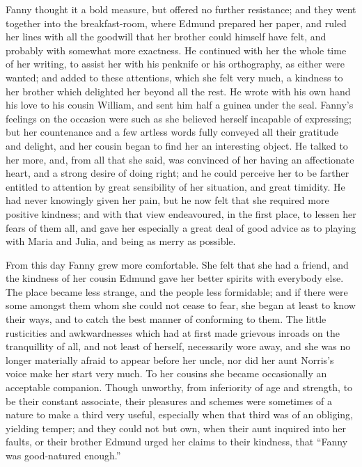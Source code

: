 \documentclass{article}
\begin{document}
Fanny thought it a bold measure, but offered no further
resistance; and they went together into the breakfast-room,
where Edmund prepared her paper, and ruled her lines
with all the goodwill that her brother could himself
have felt, and probably with somewhat more exactness.
He continued with her the whole time of her writing,
to assist her with his penknife or his orthography,
as either were wanted; and added to these attentions,
which she felt very much, a kindness to her brother which
delighted her beyond all the rest.  He wrote with his own
hand his love to his cousin William, and sent him half
a guinea under the seal.  Fanny's feelings on the occasion
were such as she believed herself incapable of expressing;
but her countenance and a few artless words fully
conveyed all their gratitude and delight, and her cousin
began to find her an interesting object.  He talked
to her more, and, from all that she said, was convinced
of her having an affectionate heart, and a strong desire
of doing right; and he could perceive her to be farther
entitled to attention by great sensibility of her situation,
and great timidity.  He had never knowingly given her pain,
but he now felt that she required more positive kindness;
and with that view endeavoured, in the first place,
to lessen her fears of them all, and gave her especially
a great deal of good advice as to playing with Maria
and Julia, and being as merry as possible.

From this day Fanny grew more comfortable.  She felt
that she had a friend, and the kindness of her cousin
Edmund gave her better spirits with everybody else.
The place became less strange, and the people less formidable;
and if there were some amongst them whom she could not
cease to fear, she began at least to know their ways,
and to catch the best manner of conforming to them.
The little rusticities and awkwardnesses which had at
first made grievous inroads on the tranquillity of all,
and not least of herself, necessarily wore away, and she
was no longer materially afraid to appear before her uncle,
nor did her aunt Norris's voice make her start very much.
To her cousins she became occasionally an acceptable companion.
Though unworthy, from inferiority of age and strength,
to be their constant associate, their pleasures and schemes
were sometimes of a nature to make a third very useful,
especially when that third was of an obliging,
yielding temper; and they could not but own, when their
aunt inquired into her faults, or their brother Edmund
urged her claims to their kindness, that ``Fanny was
good-natured enough.''
\end{document}
